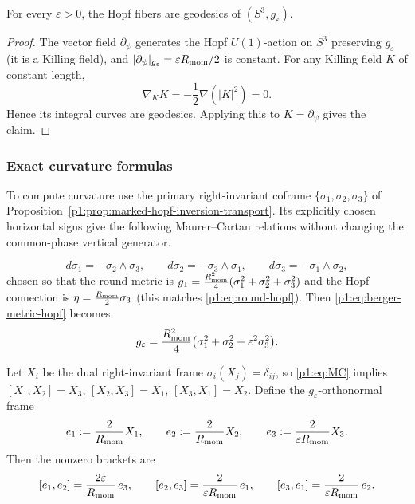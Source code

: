 \documentclass[11pt]{article}
\begin{document}
\begin{lemma}\label{p1:lem:fibers-geodesic}
For every $\varepsilon>0$, the Hopf fibers are geodesics of $(S^3,g_\varepsilon)$.
\end{lemma}

\begin{proof}
The vector field $\partial_\psi$ generates the Hopf $U(1)$-action on $S^3$ preserving
$g_\varepsilon$ (it is a Killing field), and $|\partial_\psi|_{g_\varepsilon}=\varepsilon R_{\mathrm{mom}}/2$ is constant.
For any Killing field $K$ of constant length,
\[
\nabla_K K=-\frac12\nabla(|K|^2)=0.
\]
Hence its integral curves are geodesics. Applying this to $K=\partial_\psi$ gives the claim.
\end{proof}


\subsubsection{Exact curvature formulas}
\label{p1:subsec:berger-curvature}

To compute curvature use the primary right-invariant coframe
$\{\sigma_1,\sigma_2,\sigma_3\}$ of
Proposition~\ref{p1:prop:marked-hopf-inversion-transport}.  Its explicitly
chosen horizontal signs give the following Maurer--Cartan relations without
changing the common-phase vertical generator.

\begin{equation}
\label{p1:eq:MC}
d\sigma_1=-\sigma_2\wedge\sigma_3,\qquad
d\sigma_2=-\sigma_3\wedge\sigma_1,\qquad
d\sigma_3=-\sigma_1\wedge\sigma_2,
\end{equation}
chosen so that the round metric is $g_1=\frac{R_{\mathrm{mom}}^2}{4}(\sigma_1^2+\sigma_2^2+\sigma_3^2)$ and the Hopf
connection is $\eta=\frac{R_{\mathrm{mom}}}{2}\sigma_3$ (this matches \eqref{p1:eq:round-hopf}).
Then \eqref{p1:eq:berger-metric-hopf} becomes
\begin{equation}\label{p1:eq:berger-leftinv}
g_\varepsilon=\frac{R_{\mathrm{mom}}^2}{4}\big(\sigma_1^2+\sigma_2^2+\varepsilon^2\sigma_3^2\big).
\end{equation}

Let $X_i$ be the dual right-invariant frame $\sigma_i(X_j)=\delta_{ij}$, so \eqref{p1:eq:MC} implies
$[X_1,X_2]=X_3$, $[X_2,X_3]=X_1$, $[X_3,X_1]=X_2$.
Define the $g_\varepsilon$-orthonormal frame
\[
e_1:=\frac{2}{R_{\mathrm{mom}}}X_1,\qquad e_2:=\frac{2}{R_{\mathrm{mom}}}X_2,\qquad e_3:=\frac{2}{\varepsilon R_{\mathrm{mom}}}X_3.
\]
Then the nonzero brackets are
\[
[e_1,e_2]=\frac{2\varepsilon}{R_{\mathrm{mom}}}\,e_3,\qquad
[e_2,e_3]=\frac{2}{\varepsilon R_{\mathrm{mom}}}\,e_1,\qquad
[e_3,e_1]=\frac{2}{\varepsilon R_{\mathrm{mom}}}\,e_2.
\]
\end{document}
